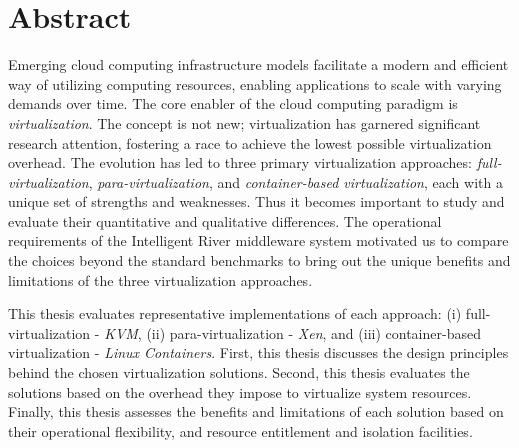 \chapter*{Abstract}



Emerging cloud computing infrastructure models facilitate a modern and efficient way of utilizing computing resources, enabling applications to scale with varying demands over time. The core enabler of the cloud computing paradigm is \textit{virtualization}. The concept is not new; virtualization has garnered significant research attention, fostering a race to achieve the lowest possible virtualization overhead. The evolution has led to three primary virtualization approaches: \textit{full-virtualization}, \textit{para-virtualization}, and \textit{container-based virtualization}, each with a unique set of strengths and weaknesses.  Thus it becomes important to study and evaluate their quantitative and qualitative differences. The operational requirements of the Intelligent River\textsuperscript{\textregistered} middleware system motivated us to compare the choices beyond the standard benchmarks to bring out the unique benefits and limitations of the three virtualization approaches.


This thesis evaluates representative implementations of each approach: (i) full-virtualization - \textit{KVM}, (ii) para-virtualization - \textit{Xen}, and (iii) container-based virtualization - \textit{Linux Containers}. First, this thesis discusses the design principles behind the chosen virtualization solutions. Second, this thesis evaluates the solutions based on the overhead they impose to virtualize system resources. Finally, this thesis assesses the benefits and limitations of each solution based on their operational flexibility, and resource entitlement and isolation facilities.





